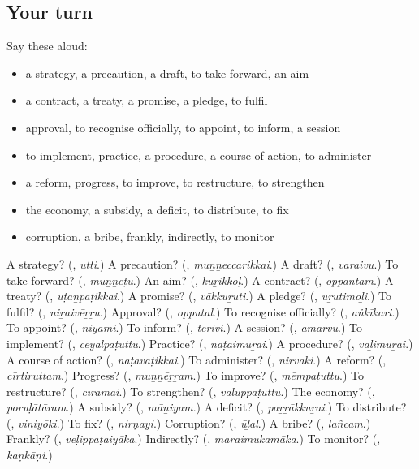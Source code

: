 \subsection*{Your turn}
Say these aloud:

\begin{itemize}
\raggedright
  \item a strategy, a precaution, a draft, to take forward, an aim
  \item a contract, a treaty, a promise, a pledge, to fulfil
  \item approval, to recognise officially, to appoint, to inform, a session
  \item to implement, practice, a procedure, a course of action, to administer
  \item a reform, progress, to improve, to restructure, to strengthen
  \item the economy, a subsidy, a deficit, to distribute, to fix
  \item corruption, a bribe, frankly, indirectly, to monitor
\end{itemize}

\begin{tcolorbox}[breakable,colback=teal!4,colframe=teal!35!black,title={Before you move on}]
A strategy? (\textbf{}, \emph{utti}.) A precaution? (\textbf{}, \emph{muṉṉeccarikkai}.) A draft? (\textbf{}, \emph{varaivu}.) To take forward? (\textbf{}, \emph{muṉṉeṭu}.) An aim? (\textbf{}, \emph{kuṟikkōḷ}.) A contract? (\textbf{}, \emph{oppantam}.) A treaty? (\textbf{}, \emph{uṭaṉpaṭikkai}.) A promise? (\textbf{}, \emph{vākkuṟuti}.) A pledge? (\textbf{}, \emph{uṟutimoḻi}.) To fulfil? (\textbf{}, \emph{niṟaivēṟṟu}.) Approval? (\textbf{}, \emph{opputal}.) To recognise officially? (\textbf{}, \emph{aṅkīkari}.) To appoint? (\textbf{}, \emph{niyami}.) To inform? (\textbf{}, \emph{terivi}.) A session? (\textbf{}, \emph{amarvu}.) To implement? (\textbf{}, \emph{ceyalpaṭuttu}.) Practice? (\textbf{}, \emph{naṭaimuṟai}.) A procedure? (\textbf{}, \emph{vaḻimuṟai}.) A course of action? (\textbf{}, \emph{naṭavaṭikkai}.) To administer? (\textbf{}, \emph{nirvaki}.) A reform? (\textbf{}, \emph{cīrtiruttam}.) Progress? (\textbf{}, \emph{muṉṉēṟṟam}.) To improve? (\textbf{}, \emph{mēmpaṭuttu}.) To restructure? (\textbf{}, \emph{cīramai}.) To strengthen? (\textbf{}, \emph{valuppaṭuttu}.) The economy? (\textbf{}, \emph{poruḷātāram}.) A subsidy? (\textbf{}, \emph{māṉiyam}.) A deficit? (\textbf{}, \emph{paṟṟākkuṟai}.) To distribute? (\textbf{}, \emph{viniyōki}.) To fix? (\textbf{}, \emph{nirṇayi}.) Corruption? (\textbf{}, \emph{ūḻal}.) A bribe? (\textbf{}, \emph{lañcam}.) Frankly? (\textbf{}, \emph{veḷippaṭaiyāka}.) Indirectly? (\textbf{}, \emph{maṟaimukamāka}.) To monitor? (\textbf{}, \emph{kaṇkāṇi}.)
\end{tcolorbox}
